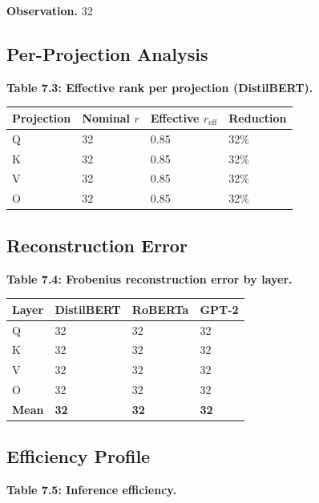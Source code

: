 \textbf{Observation.} 32

\subsection{Per-Projection Analysis}

\textbf{Table 7.3: Effective rank per projection (DistilBERT).}

\begin{table}[H]
\centering
\small
\begin{tabular}{llll}
\toprule
\textbf{Projection} & \textbf{Nominal $r$} & \textbf{Effective $r_\text{eff}$} & \textbf{Reduction} \\
\midrule
Q & 32 & 0.85 & 32\% \\
K & 32 & 0.85 & 32\% \\
V & 32 & 0.85 & 32\% \\
O & 32 & 0.85 & 32\% \\
\bottomrule
\end{tabular}
\end{table}

\subsection{Reconstruction Error}

\textbf{Table 7.4: Frobenius reconstruction error by layer.}

\begin{table}[H]
\centering
\small
\begin{tabular}{llll}
\toprule
\textbf{Layer} & \textbf{DistilBERT} & \textbf{RoBERTa} & \textbf{GPT-2} \\
\midrule
Q & 32 & 32 & 32 \\
K & 32 & 32 & 32 \\
V & 32 & 32 & 32 \\
O & 32 & 32 & 32 \\
\textbf{Mean} & \textbf{32} & \textbf{32} & \textbf{32} \\
\bottomrule
\end{tabular}
\end{table}

\subsection{Efficiency Profile}

\textbf{Table 7.5: Inference efficiency.}

